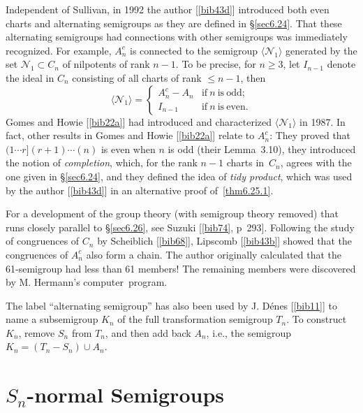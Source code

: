 \documentclass{surv-l}
\numberwithin{equation}{section}
\numberwithin{table}{section}
\numberwithin{figure}{section}
\theoremstyle{plain}
\theoremstyle{definition}
\begin{document}
Independent of Sullivan, in 1992 the author
[\ref{bib43d}] introduced both even charts and
alternating semigroups as they are defined in \S\ref{sec6.24}.
That these alternating semigroups had connections with other
semigroups was immediately recognized. For example, $A_{n}^{c}$ is
connected to the semigroup $\langle\mathcal{N}_{1}\rangle$
generated by the set $\mathcal{N}_{1}\subset C_{n}$ of nilpotents
of rank $n-1$. To be precise, for $n \geq 3$, let $I_{n-1}$ denote
the ideal in $C_{n}$ consisting of all charts of rank $\leq n -1$,
then
\[
\langle \mathcal{N}_{1}\rangle=\begin{cases}
A_{n}^{c}-A_{n} & \mathrm{if}\ n\ \mathrm{is\ odd};\\
I_{n-1} &\mathrm{if}\ n\ \mathrm{is\ even}.
\end{cases}
\]
Gomes and Howie
[\ref{bib22a}] had introduced and characterized
$\langle \mathcal{N}_{1}\rangle$ in 1987. In fact, other results
in Gomes and Howie
[\ref{bib22a}] relate to $A_{n}^{c}$: They
proved that $(1\cdots r](r+1)\cdots(n)$ is even when $n$ is odd
(their Lemma~3.10), they introduced the notion of
\emph{completion}, which, for the
rank $n-1$ charts in~$C_{n}$, agrees with the one given in
\S\ref{sec6.24}, and they defined the idea of \emph{tidy
product}, which was used by the author
[\ref{bib43d}] in an alternative proof
of~\ref{thm6.25.1}.

For a development of the group theory (with semigroup theory
removed) that runs closely parallel to \S\ref{sec6.26}, see
Suzuki [\ref{bib74}, p~293].
Following the study of congruences of $C_{n}$ by
Scheiblich
[\ref{bib68}], Lipscomb
[\ref{bib43b}] showed that the congruences of
$A_{n}^{c}$ also form a chain. The author originally calculated
that the 61-semigroup had less than 61 members! The remaining
members were discovered by M. Hermann's
computer~program.

The label ``alternating semigroup'' has also been used by J.
D\'{e}nes [\ref{bib11}] to name a subsemigroup
$K_{n}$ of the full transformation semigroup $T_{n}$. To construct
$K_{n}$, remove $S_{n}$ from $T_{n}$, and then add back $A_{n}$,
i.e., the semigroup $K_{n}=(T_{n}-S_{n})\cup A_{n}$.

\chapter{$S_{n}$-normal Semigroups}\label{chap7}
\end{document}
